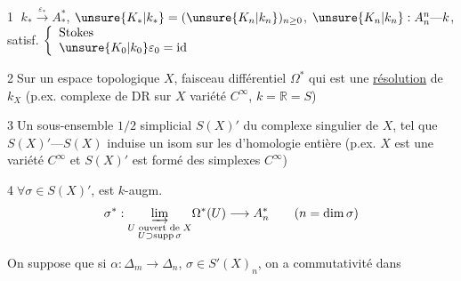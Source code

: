 
\textcircled{1}\quad
$k_*\xrightarrow{\varepsilon_*}A_*^*$,
$\unsure{K_*|k_*}=(\unsure{K_n|k_n})_{n\geq0}$,
$\unsure{K_n|k_n}:A_n^n\text{---}k$, satisf.
$\left\{\begin{array}{l}\text{Stokes}\\ \unsure{K_0|k_0}\varepsilon_0=\mathrm{id}\end{array}\right.$

\textcircled{2}\quad Sur un  espace topologique $X$,
faisceau différentiel 
 $\Omega^*$ qui est une \uline{résolution} de $k_X$
(p.ex. complexe de DR sur $X$ variété $C^\infty$, $k=\mathbb R=S$)

\textcircled{3}\quad Un sous-ensemble $1/2$ simplicial $S(X)'$ du complexe singulier de $X$, tel que
$S(X)'\text{---}S(X)$  induise un isom sur les  d'homologie entière
(p.ex. $X$ est une variété $C^\infty$ et $S(X)'$ est formé des simplexes $C^\infty$)


\textcircled{4}\quad $\forall\sigma\in S(X)'$, est
 $k$-augm.
\[
\sigma^*:\underset{\substack{U\text{ ouvert de }X\\ U\supset\operatorname{supp}\sigma}}{\varinjlim}
\Omega^*(U)\longrightarrow A_n^*
\qquad(n=\dim\sigma)
\]

On suppose que si $\alpha:\Delta_m\longrightarrow\Delta_n$,
$\sigma\in S'(X)_n$,
on a commutativité dans


